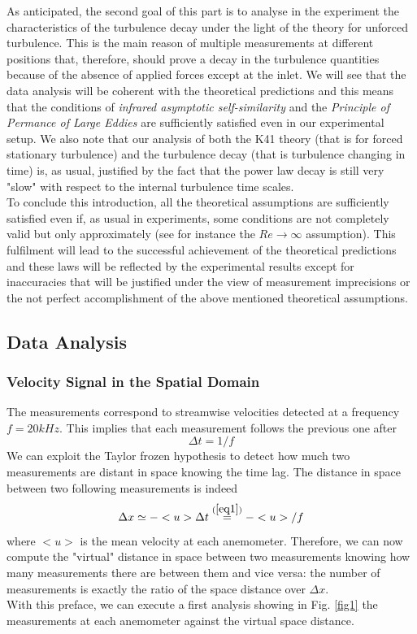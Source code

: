 \documentclass[11pt,titlepage]{article}
\begin{document}
As anticipated, the second goal of this part is to analyse in the experiment the characteristics of the turbulence decay under the light of the theory for unforced turbulence. This is the main reason of multiple measurements at different positions that, therefore, should prove a decay in the turbulence quantities because of the absence of applied forces except at the inlet. We will see that the data analysis will be coherent with the theoretical predictions and this means that the conditions of \emph{infrared asymptotic self-similarity} and the \emph{Principle of Permance of Large Eddies} are sufficiently satisfied even in our experimental setup. We also note that our analysis of both the K41 theory (that is for forced stationary turbulence) and the turbulence decay (that is turbulence changing in time) is, as usual, justified by the fact that the power law decay is still very "slow" with respect to the internal turbulence time scales. \\
To conclude this introduction, all the theoretical assumptions are sufficiently satisfied even if, as usual in experiments, some conditions are not completely valid but only approximately (see for instance the $Re\rightarrow \infty$ assumption). This fulfilment will lead to the successful achievement of the theoretical predictions and these laws will be reflected by the experimental results except for inaccuracies that will be justified under the view of measurement imprecisions or the not perfect accomplishment of the above mentioned theoretical assumptions.


\newpage
\subsection{Data Analysis}

\subsubsection{Velocity Signal in the Spatial Domain}\label{velocity_signal_in_the_spatial_domain}
The measurements correspond to streamwise velocities detected at a frequency $f=20kHz$. This implies that each measurement follows the previous one after 
\begin{equation} \label{eq1}
\Delta t = 1/f
\end{equation}
We can exploit the Taylor frozen hypothesis to detect how much two measurements are distant in space knowing the time lag. The distance in space between two following measurements is indeed
\begin{equation} \label{eq2}
	\Delta x \simeq - <u> \Delta t \overset{(\ref{eq1})}{=} -<u>/f
\end{equation}
	where $<u>$ is the mean velocity at each anemometer. Therefore, we can now compute the "virtual" distance in space between two measurements knowing how many measurements there are between them and vice versa: the number of measurements is exactly the ratio of the space distance over $\Delta x$. \\
With this preface, we can execute a first analysis showing in Fig. \ref{fig1} the measurements at each anemometer against the virtual space distance. \\
\end{document}
